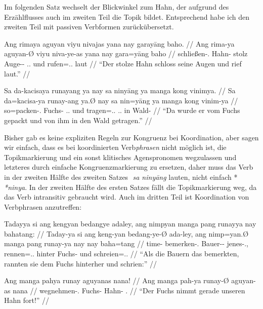 \documentclass[12pt,paper=a4]{scrartcl}
\newcommand{\PargI}{{\Parg}.{\Inan}}
\newcommand{\TsgM}{{\Tsg}.{\M}}
\newcommand{\TplM}{{\Tpl}.{\M}}
\newcommand{\zwsp}{\mbox{​}} %
\newcommand{\rayr}[2]{\zwsp\smash{{\Tagati #1}} \emph{#2}} %
\begin{document}
Im folgenden Satz wechselt der Blickwinkel zum Hahn, der aufgrund des Erzählflusses auch im zweiten Teil die Topik bildet. Entsprechend habe ich den zweiten Teil mit passiven Verbformen zurückübersetzt. 

\pex %
\a\begingl
	\gla Ang rimaya aguyan viyu nivajas yana nay garayāng baho. //
	\glb Ang rima-ya aguyan-Ø viyu niva-ye-as yana nay gara=yāng baho //
	\glc \AgtT{} schließen-\TsgM{} Hahn-\Top{} stolz Auge-\Pl{}-\Parg{} \TsgM{}.\Gen{} und rufen=\TsgM{}.\Aarg{} laut //
	\glft \enquote{Der stolze Hahn schloss seine Augen und rief laut.} //
\endgl

\a\begingl
	\gla Sa da-kacisaya runayang ya nay sa ninyāng ya manga kong vinimya. //
	\glb Sa da=kacisa-ya runay-ang ya.Ø nay sa nin=yāng ya manga kong vinim-ya //
	\glc \PatT{} so=packen-\TsgM{} Fuchs-\Aarg{} \TsgM{}.\Top{} und \PatT{} tragen=\TsgM{}.\Aarg{} \TsgM{}.\Top{} \Dyn{} in Wald-\Loc{} //
	\glft \enquote{Da wurde er vom Fuchs gepackt und von ihm in den Wald getragen.} //
\endgl

\xe

Bisher gab es keine expliziten Regeln zur Kongruenz bei Koordination, aber sagen wir einfach, dass es bei koordinierten Verb\emph{phrasen} nicht möglich ist, die Topikmarkierung und ein sonst klitisches Agenspronomen wegzulassen und letzteres durch einfache Kongruenzmarkierung zu ersetzen, daher muss das Verb in der zweiten Hälfte des zweiten Satzes \rayr{s ninFyaaNF}{sa ninyāng} lauten, nicht einfach *\rayr{ninY}{*ninya}. In der zweiten Hälfte des ersten Satzes fällt die Topikmarkierung weg, da das Verb intransitiv gebraucht wird. Auch im dritten Teil ist Koordination von Verbphrasen anzutreffen:

\pex %
\a\begingl
	\gla Tadayya si ang kengyan bedangye adaley, ang nimpyan manga pang runayya nay bahatang: //
	\glb Taday-ya si ang keng-yan bedang-ye-Ø ada-ley, ang nimp=yan.Ø manga pang runay-ya nay nay baha=tang //
	\glc time-\Loc{} \Rel{} \AgtT{} bemerken-\TplM{} Bauer-\Pl{}-\Top{} jenes-\PargI{}, \AgtT{} rennen=\TplM{}.\Top{} \Dyn{} hinter Fuchs-\Loc{} und schreien=\TplM{}.\Aarg{} //
	\glft \enquote{Als die Bauern das bemerkten, rannten sie dem Fuchs hinterher und schrien:} //
\endgl

\a\begingl
	\gla Ang manga pahya runay aguyanas nana! //
	\glb Ang manga pah-ya runay-Ø aguyan-as nana //
	\glc \AgtT{} \Prog{} wegnehmen-\TsgM{} Fuchs-\Top{} Hahn-\Parg{} \Fsg{}.\Gen{} //
	\glft \enquote{Der Fuchs nimmt gerade unseren Hahn fort!} //
\endgl

\xe
\end{document}
